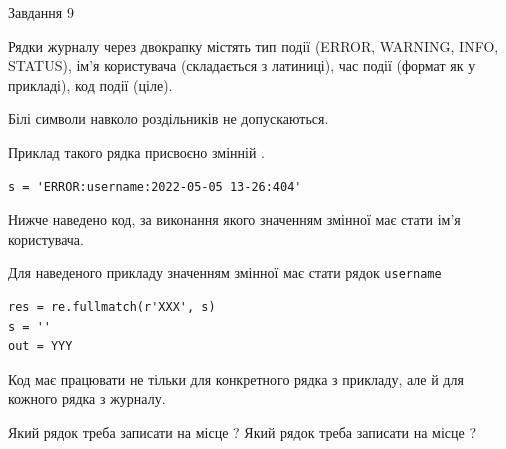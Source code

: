 \documentclass[12pt, ukrainian]{article}
\def\code#1{\Verb!#1!}
\begin{document}
{\begin{minipage}[t]{8.0cm}
\end{minipage}

               
{\begin{center}Завдання {9}\end{center}}
\vspace{-4mm}
Рядки журналу через двокрапку містять тип події (ERROR, WARNING, INFO, STATUS), ім'я користувача (складається з латиниці), час події (фор\-мат як у прикладі), код події (ціле).

Білі символи навколо роздільників не допускаються.

Приклад такого рядка присвоєно змінній .



\begin{verbatim}
s = 'ERROR:username:2022-05-05 13-26:404'
\end{verbatim}


Нижче наведено код, за виконання якого значенням змінної  має стати ім'я користувача.

Для наведеного прикладу значенням змінної  має стати рядок \code{username}



\begin{verbatim}
res = re.fullmatch(r'XXX', s)
s = ''
out = YYY
\end{verbatim}


Код має працювати не тільки для конкретного рядка з прикладу, але й для кожного рядка з журналу.


Який рядок треба записати на місце  ?
Який рядок треба записати на місце  ?\par

}
\end{document}
